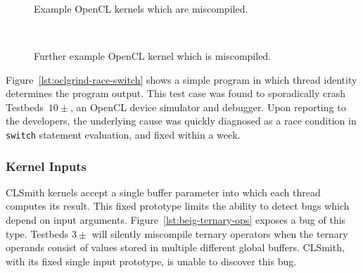 \begin{figure}
  \centering %
  \\%
  \\%
  \\%
  \caption[Example kernels which are miscompiled]{%
    Example OpenCL kernels which are miscompiled.%
  }%
\end{figure}

\begin{figure}
  \centering %
  \\%
  \caption[Further example kernel which is miscompiled]{%
    Further example OpenCL kernel which is miscompiled.%
  }%
\end{figure}

Figure~\ref{lst:oclgrind-race-switch} shows a simple program in which thread identity determines the program output. This test case was found to sporadically crash Testbeds~$10\pm$, an OpenCL device simulator and debugger. Upon reporting to the developers, the underlying cause was quickly diagnosed as a race condition in \texttt{switch} statement evaluation, and fixed within a week.


\subsubsection{Kernel Inputs}

CLSmith kernels accept a single buffer parameter into which each thread computes its result. This fixed prototype limits the ability to detect bugs which depend on input arguments. Figure~\ref{lst:beig-ternary-ops} exposes a bug of this type. Testbeds $3\pm$ will silently miscompile ternary operators when the ternary operands consist of values stored in multiple different global buffers. CLSmith, with its fixed single input prototype, is unable to discover this bug.


